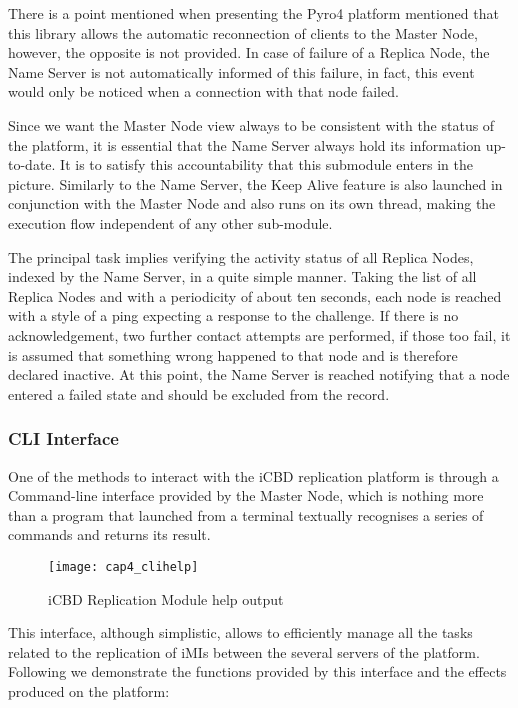 There is a point mentioned when presenting the Pyro4 platform mentioned that this library allows the automatic reconnection of clients to the Master Node, however, the opposite is not provided. In case of failure of a Replica Node, the Name Server is not automatically informed of this failure, in fact, this event would only be noticed when a connection with that node failed.

Since we want the Master Node view always to be consistent with the status of the platform, it is essential that the Name Server always hold its information up-to-date. It is to satisfy this accountability that this submodule enters in the picture. Similarly to the Name Server, the Keep Alive feature is also launched in conjunction with the Master Node and also runs on its own thread, making the execution flow independent of any other sub-module.

The principal task implies verifying the activity status of all Replica Nodes, indexed by the Name Server, in a quite simple manner. Taking the list of all Replica Nodes and with a periodicity of about ten seconds, each node is reached with a style of a ping expecting a response to the challenge. If there is no acknowledgement, two further contact attempts are performed, if those too fail, it is assumed that something wrong happened to that node and is therefore declared inactive. At this point, the Name Server is reached notifying that a node entered a failed state and should be excluded from the record. 

\subsubsection{CLI Interface}
\label{subsub:impl_icbdrep_cli_interface}

One of the methods to interact with the iCBD replication platform is through a Command-line interface provided by the Master Node, which is nothing more than a program that launched from a terminal textually recognises a series of commands and returns its result.

\begin{figure}[htbp]
	\centering
	\texttt{[image: cap4\_clihelp]}
	\caption{iCBD Replication Module help output}
	\label{fig:icbd_rep_clihelp}
\end{figure}

This interface, although simplistic, allows to efficiently manage all the tasks related to the replication of iMIs between the several servers of the platform. Following we demonstrate the functions provided by this interface and the effects produced on the platform:


